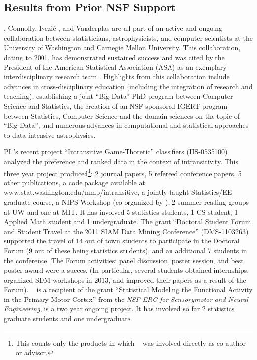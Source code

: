 \subsection{             Results from Prior NSF Support             }
\label{sec:priorNSF}

\meila, Connolly, Ivezi\'{c} , and Vanderplas are all part of an active
and ongoing collaboration between statisticians, astrophysicists, and
computer scientists at the University of Washington and Carnegie
Mellon University.  This collaboration, dating to 2001, has
demonstrated sustained success and was cited by the President of the
American Statistical Association (ASA) as an exemplary
interdisciplinary research team \cite{straf03}. Highlights from this
collaboration include advances in cross-disciplinary education
(including the integration of research and teaching), establishing a
joint ``Big-Data'' PhD program between Computer Science and
Statistics, the creation of an NSF-sponsored IGERT program between
Statistics, Computer Science and the domain sciences on the topic of
``Big-Data'', and numerous advances in computational and statistical
approaches to data intensive astrophysics.

PI \meila's recent project ``Intransitive Game-Thoretic'' classifiers
(IIS-0535100) analyzed the preference and ranked data in the context
of intransitivity. This three year project produced\footnote{This
  counts only the products in which \meila~ was involved directly as
  co-author or advisor.}: 2 journal papers, 5 refereed conference
papers, 5 other publications, a code package available at
{www.stat.washington.edu/mmp/intransitive}, a jointly taught
Statistics/EE graduate course, a NIPS Workshop (co-organized by
\meila), 2 summer reading groups at UW and one at MIT. It has involved
5 statistics students, 1 CS student, 1 Applied Math student and 1
undergraduate. The grant ``Doctoral Student Forum and Student Travel
at the 2011 SIAM Data Mining Conference'' (DMS-1103263) supported the
travel of 14 out of town students to participate in the Doctoral Forum
(9 out of these being statistics students), and an additional 7
students in the conference. The Forum activities: panel discussion,
poster session, and best poster award were a succes. (In particular,
several students obtained internships, organized SDM workshops in
2013, and improved their papers as a result of the Forum). \meila~ is
a recipient of the grant ``Statistical Modeling the Functional
Activity in the Primary Motor Cortex'' from the {\em NSF ERC for
  Sensorymotor and Neural Engineering}, is a two year ongoing
project. It has involved so far 2 statistics graduate students and one
undergraduate.

